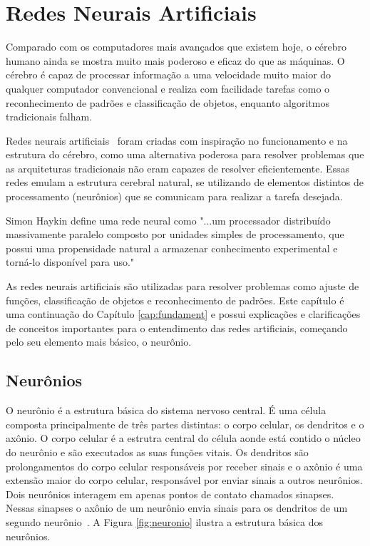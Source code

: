 \chapter{Redes Neurais Artificiais} \label{cap:redes}

Comparado com os computadores mais avançados que existem hoje, o cérebro humano ainda se mostra muito mais poderoso e eficaz do que as máquinas. O cérebro é capaz de processar informação a uma velocidade muito maior do qualquer computador convencional e realiza com facilidade tarefas como o reconhecimento de padrões e classificação de objetos, enquanto algoritmos tradicionais falham. 

Redes neurais artificiais~\cite{Haykin} foram criadas com inspiração no funcionamento e na estrutura do cérebro, como uma alternativa poderosa para resolver problemas que as arquiteturas tradicionais não eram capazes de resolver eficientemente. Essas redes emulam a estrutura cerebral natural, se utilizando de elementos distintos de processamento (neurônios) que se comunicam para realizar a tarefa desejada. 

Simon Haykin define uma rede neural como "...um processador distribuído massivamente paralelo composto por unidades simples de processamento, que possui uma propensidade natural a armazenar conhecimento experimental e torná-lo disponível para uso."

As redes neurais artificiais são utilizadas para resolver problemas como ajuste de funções, classificação de objetos e reconhecimento de padrões. Este capítulo é uma continuação do Capítulo \ref{cap:fundament} e possui explicações e clarificações de conceitos importantes para o entendimento das redes artificiais, começando pelo seu elemento mais básico, o neurônio.

\section{Neurônios}

O neurônio é a estrutura básica do sistema nervoso central. É uma célula composta principalmente de três partes distintas: o corpo celular, os dendritos e o axônio. O corpo celular é a estrutra central do célula aonde está contido o núcleo do neurônio e são executados as suas funções vitais. Os dendritos são prolongamentos do corpo celular responsáveis por receber sinais e o axônio é uma extensão maior do corpo celular, responsável por enviar sinais a outros neurônios. Dois neurônios interagem em apenas  pontos de contato chamados sinapses. Nessas sinapses o axônio de um neurônio envia sinais para os dendritos de um segundo neurônio~\cite{Kosabov}. A Figura \ref{fig:neuronio} ilustra a estrutura básica dos neurônios.

